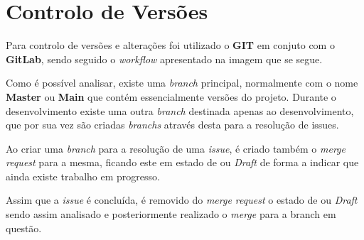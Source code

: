 \section{Controlo de Versões}

Para controlo de versões e alterações foi utilizado o \textbf{GIT} em conjuto com o \textbf{GitLab}, sendo seguido o \textit{workflow} apresentado na imagem que se segue.


Como é possível analisar, existe uma \textit{branch} principal, normalmente com o nome \textbf{Master} ou \textbf{Main} que contém essencialmente versões do projeto. Durante o desenvolvimento existe uma outra \textit{branch} destinada apenas ao desenvolvimento, que por sua vez são criadas \textit{branchs} através desta para a resolução de issues.

Ao criar uma \textit{branch} para a resolução de uma \textit{issue}, é criado também o \textit{merge request} para a mesma, ficando este em estado de \textit{} ou \textit{Draft} de forma a indicar que ainda existe trabalho em progresso.

Assim que a \textit{issue} é concluída, é removido do \textit{merge request} o estado de \textit{} ou \textit{Draft} sendo assim analisado e posteriormente realizado o \textit{merge} para a branch em questão.